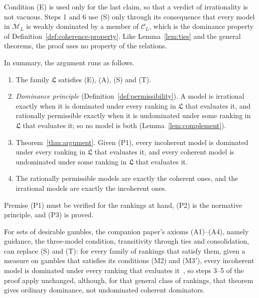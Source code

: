 \documentclass[11pt]{article}
\theoremstyle{definition}
\theoremstyle{remark}
\newcommand{\M}{\mathcal M}
\newcommand{\C}{\mathcal C}
\newcommand{\Lf}{\mathfrak L}
\begin{document}
Condition (E) is used only for the last claim, so that a verdict of irrationality is not vacuous. Steps 1 and 6 use (S) only through its consequence that every model in $\M_L$ is weakly dominated by a member of $\C_L$, which is the dominance property of Definition~\ref{def:coherence-property}. Like Lemma~\ref{lem:ties} and the general theorems, the proof uses no property of the relations.

In summary, the argument runs as follows.
\begin{enumerate}[label=\textbf{(P\arabic*)},leftmargin=*]
\item The family $\Lf$ satisfies (E), (A), (S) and (T).
\item \emph{Dominance principle} (Definition~\ref{def:permissibility}). A model is irrational exactly when it is dominated under every ranking in $\Lf$ that evaluates it, and rationally permissible exactly when it is undominated under some ranking in $\Lf$ that evaluates it; so no model is both (Lemma~\ref{lem:complement}).
\item Theorem~\ref{thm:argument}. Given (P1), every incoherent model is dominated under every ranking in $\Lf$ that evaluates it, and every coherent model is undominated under some ranking in $\Lf$ that evaluates it.
\item[\textbf{(C)}] The rationally permissible models are exactly the coherent ones, and the irrational models are exactly the incoherent ones.
\end{enumerate}
Premise (P1) must be verified for the rankings at hand, (P2) is the normative principle, and (P3) is proved.

For sets of desirable gambles, the companion paper's axioms (A1)--(A4), namely guidance, the three-model condition, transitivity through ties and consolidation, can replace (S) and (T): for every family of rankings that satisfy them, given a measure on gambles that satisfies its conditions (M2) and (M3$'$), every incoherent model is dominated under every ranking that evaluates it~\cite[Theorem~4.1]{KCM}, so steps 3--5 of the proof apply unchanged, although, for that general class of rankings, that theorem gives ordinary dominance, not undominated coherent dominators.
\end{document}
